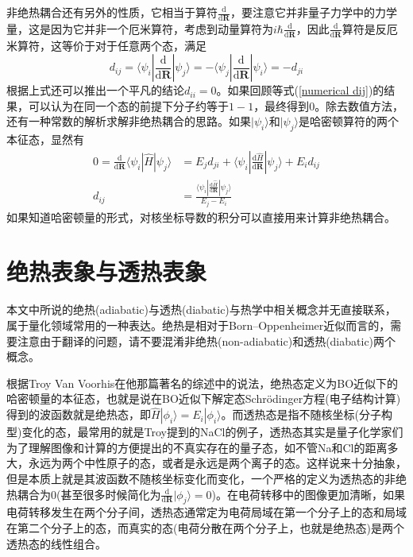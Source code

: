 \documentclass[12pt,a4paper,openany,twoside]{book}
\numberwithin{equation}{section}
\begin{document}
        非绝热耦合还有另外的性质，它相当于算符$\frac{\mathrm{d}}{\mathrm{d}\mathbf{R}}$，要注意它并非量子力学中的力学量，这是因为它并非一个厄米算符，考虑到动量算符为$i\hbar\frac{\mathrm{d}}{\mathrm{d}\mathbf{R}}$，因此$\frac{\mathrm{d}}{\mathrm{d}\mathbf{R}}$算符是反厄米算符，这等价于对于任意两个态，满足
        \begin{equation}
          d_{ij}=\langle\psi_i|\frac{\mathrm{d}}{\mathrm{d}\mathbf{R}}|\psi_j\rangle=-\langle\psi_j|\frac{\mathrm{d}}{\mathrm{d}\mathbf{R}}|\psi_i\rangle=-d_{ji}
          \label{dij=-dji}
        \end{equation}
        根据上式还可以推出一个平凡的结论$d_{ii}=0$。如果回顾等式(\ref{numerical dij})的结果，可以认为在同一个态的前提下分子约等于$1-1$，最终得到$0$。除去数值方法，还有一种常数的解析求解非绝热耦合的思路。如果$|\psi_i\rangle$和$|\psi_j\rangle$是哈密顿算符的两个本征态，显然有
        \begin{equation}
          \begin{aligned}
            0=\frac{\mathrm{d}}{\mathrm{d}\mathbf{R}}\langle\psi_i|\hat{H}|\psi_j\rangle&=E_j d_{ji}+\langle\psi_i|\frac{\mathrm{d}\hat{H}}{\mathrm{d}\mathbf{R}}|\psi_j\rangle+E_i d_{ij}\\
            d_{ij}&=\frac{\langle\psi_i|\frac{\mathrm{d}\hat{H}}{\mathrm{d}\mathbf{R}}|\psi_j\rangle}{E_j-E_i}
          \end{aligned} 
          \label{analytical dij}
        \end{equation}
        如果知道哈密顿量的形式，对核坐标导数的积分可以直接用来计算非绝热耦合。
      \section{绝热表象与透热表象}
        本文中所说的绝热(adiabatic)与透热(diabatic)与热学中相关概念并无直接联系，属于量化领域常用的一种表达。绝热是相对于Born–Oppenheimer近似而言的，需要注意由于翻译的问题，请不要混淆非绝热(non-adiabatic)和透热(diabatic)两个概念。

        根据Troy Van Voorhis在他那篇著名的综述\cite{VanVoorhis2010}中的说法，绝热态定义为BO近似下的哈密顿量的本征态，也就是说在BO近似下解定态Schr\"odinger方程(电子结构计算)得到的波函数就是绝热态，即$\hat{H}|\phi_i\rangle=E_i|\phi_i\rangle$。而透热态是指不随核坐标(分子构型)变化的态，最常用的就是Troy提到的NaCl的例子，透热态其实是量子化学家们为了理解图像和计算的方便提出的不真实存在的量子态，如不管Na和Cl的距离多大，永远为两个中性原子的态，或者是永远是两个离子的态。这样说来十分抽象，但是本质上就是其波函数不随核坐标变化而变化，一个严格的定义为透热态的非绝热耦合为0(甚至很多时候简化为$\frac{\mathrm{d}}{\mathrm{d}\mathbf{R}}|\phi_j\rangle=0$)。在电荷转移中的图像更加清晰，如果电荷转移发生在两个分子间，透热态通常定为电荷局域在第一个分子上的态和局域在第二个分子上的态，而真实的态(电荷分散在两个分子上，也就是绝热态)是两个透热态的线性组合。
\end{document}
